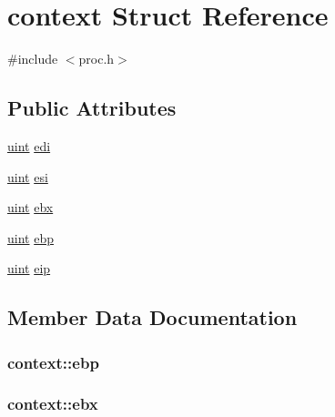 \hypertarget{structcontext}{}\section{context Struct Reference}
\label{structcontext}


{\ttfamily \#include $<$proc.\+h$>$}

\subsection*{Public Attributes}
\begin{DoxyCompactItemize}
\item 
\hyperlink{types_8h_a91ad9478d81a7aaf2593e8d9c3d06a14}{uint} \hyperlink{structcontext_a9c926d583d00a615327b9b4a8fe0ab63}{edi}
\item 
\hyperlink{types_8h_a91ad9478d81a7aaf2593e8d9c3d06a14}{uint} \hyperlink{structcontext_a9596ea769c8681490bbc67fd1b0abc92}{esi}
\item 
\hyperlink{types_8h_a91ad9478d81a7aaf2593e8d9c3d06a14}{uint} \hyperlink{structcontext_ab1dd54ca1266e38df5943750224cd8d5}{ebx}
\item 
\hyperlink{types_8h_a91ad9478d81a7aaf2593e8d9c3d06a14}{uint} \hyperlink{structcontext_ac9640ddc2e90e4213ba9847bbe1b0e57}{ebp}
\item 
\hyperlink{types_8h_a91ad9478d81a7aaf2593e8d9c3d06a14}{uint} \hyperlink{structcontext_a0cfb49e5b03fd7bf12fa79d1a42be935}{eip}
\end{DoxyCompactItemize}


\subsection{Member Data Documentation}
\subsubsection[{\texorpdfstring{ebp}{ebp}}]{ context\+::ebp}\hypertarget{structcontext_ac9640ddc2e90e4213ba9847bbe1b0e57}{}\label{structcontext_ac9640ddc2e90e4213ba9847bbe1b0e57}
\subsubsection[{\texorpdfstring{ebx}{ebx}}]{ context\+::ebx}\hypertarget{structcontext_ab1dd54ca1266e38df5943750224cd8d5}{}\label{structcontext_ab1dd54ca1266e38df5943750224cd8d5}
